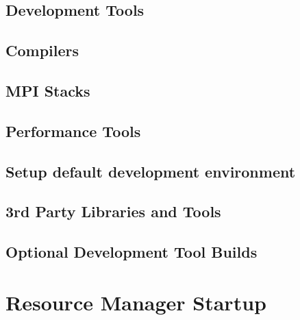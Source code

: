\documentclass[letterpaper]{article}
\begin{document}
\subsection{Development Tools} \label{sec:install_dev_tools}


\subsection{Compilers} \label{sec:install_compilers}


\subsection{MPI Stacks} \label{sec:mpi}


\subsection{Performance Tools} \label{sec:install_perf_tools}


\subsection{Setup default development environment}


\subsection{3rd Party Libraries and Tools} \label{sec:3rdparty}





\subsection{Optional Development Tool Builds} \label{sec:3rdparty_intel}
\vspace*{0.2cm}


\clearpage
\section{Resource Manager Startup} \label{sec:rms_startup}

\end{document}

